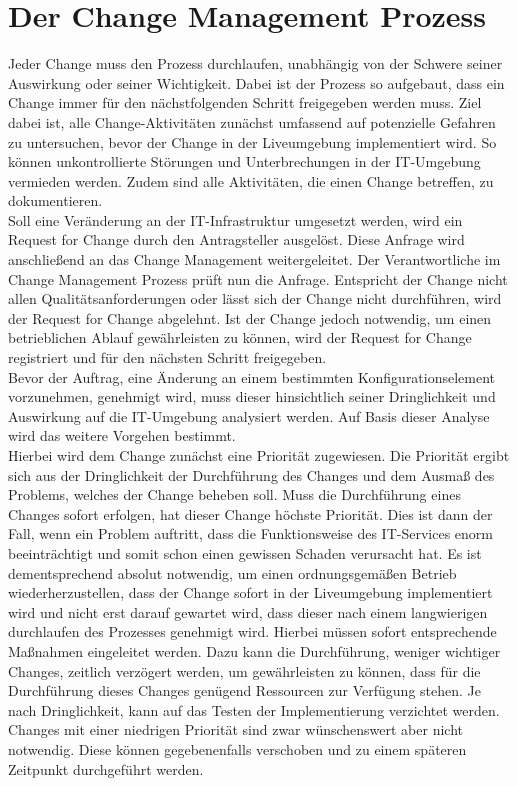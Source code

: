\section{Der Change Management Prozess}
\vspace{-0.1cm}
Jeder Change muss den Prozess durchlaufen, unabhängig von der Schwere  seiner Auswirkung oder seiner Wichtigkeit. Dabei ist der Prozess so aufgebaut, dass ein Change immer für den nächstfolgenden Schritt freigegeben werden muss. 
Ziel dabei ist, alle Change-Aktivitäten zunächst umfassend auf potenzielle Gefahren zu untersuchen, bevor der Change in der Liveumgebung implementiert wird. So können unkontrollierte Störungen und Unterbrechungen in der IT-Umgebung vermieden werden.
Zudem sind alle Aktivitäten, die einen Change betreffen, zu dokumentieren. 
\\
Soll eine Veränderung an der IT-Infrastruktur umgesetzt werden, wird ein Request for Change durch den Antragsteller ausgelöst. Diese Anfrage wird anschließend an das Change Management weitergeleitet. Der Verantwortliche im Change Management Prozess prüft nun die Anfrage. Entspricht der Change nicht allen Qualitätsanforderungen oder lässt sich der Change nicht durchführen, wird der Request for Change abgelehnt. Ist der Change jedoch notwendig, um einen betrieblichen Ablauf gewährleisten zu können, wird der Request for Change registriert und für den nächsten Schritt freigegeben. 
\\
Bevor der Auftrag, eine Änderung an einem bestimmten Konfigurationselement vorzunehmen, genehmigt wird, muss dieser hinsichtlich seiner Dringlichkeit und Auswirkung auf die IT-Umgebung analysiert werden. Auf Basis dieser Analyse wird das weitere Vorgehen bestimmt.
\\
Hierbei wird dem Change zunächst eine Priorität zugewiesen. Die Priorität ergibt sich aus der Dringlichkeit der Durchführung des Changes und dem Ausmaß des Problems, welches der Change beheben soll. Muss die Durchführung eines Changes sofort erfolgen, hat dieser Change höchste Priorität. 
Dies ist dann der Fall, wenn ein Problem auftritt, dass die Funktionsweise des IT-Services enorm beeinträchtigt und somit schon einen gewissen Schaden verursacht hat. Es ist dementsprechend absolut notwendig, um einen ordnungsgemäßen Betrieb wiederherzustellen, dass der Change sofort in der Liveumgebung implementiert wird und nicht erst darauf gewartet wird, dass dieser nach einem langwierigen durchlaufen des Prozesses genehmigt wird. 
Hierbei müssen sofort entsprechende Maßnahmen eingeleitet werden. Dazu kann die Durchführung, weniger wichtiger Changes, zeitlich verzögert werden, um gewährleisten zu können, dass für die Durchführung dieses Changes genügend Ressourcen zur Verfügung stehen. Je nach Dringlichkeit, kann auf das Testen der Implementierung verzichtet werden. Changes mit einer niedrigen Priorität sind zwar wünschenswert aber nicht notwendig. Diese können gegebenenfalls verschoben und zu einem späteren Zeitpunkt durchgeführt werden.
